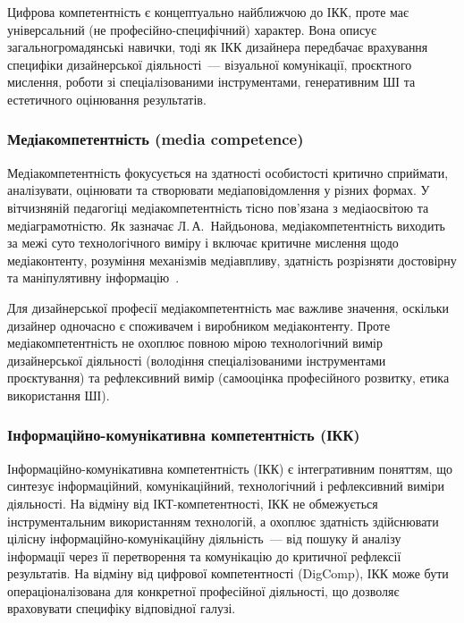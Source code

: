 Цифрова компетентність є концептуально найближчою до ІКК, проте має універсальний (не професійно-специфічний) характер. Вона описує загальногромадянські навички, тоді як ІКК дизайнера передбачає врахування специфіки дизайнерської діяльності~--- візуальної комунікації, проєктного мислення, роботи зі спеціалізованими інструментами, генеративним ШІ та естетичного оцінювання результатів.

\subsubsection{Медіакомпетентність (media competence)}\label{sssec:1.1.4}

Медіакомпетентність фокусується на здатності особистості критично сприймати, аналізувати, оцінювати та створювати медіаповідомлення у різних формах. У вітчизняній педагогіці медіакомпетентність тісно пов'язана з медіаосвітою та медіаграмотністю. Як зазначає Л.\,А.~Найдьонова, медіакомпетентність виходить за межі суто технологічного виміру і включає критичне мислення щодо медіаконтенту, розуміння механізмів медіавпливу, здатність розрізняти достовірну та маніпулятивну інформацію~\cite{Naidonova2013Media}.

Для дизайнерської професії медіакомпетентність має важливе значення, оскільки дизайнер одночасно є споживачем і виробником медіаконтенту. Проте медіакомпетентність не охоплює повною мірою технологічний вимір дизайнерської діяльності (володіння спеціалізованими інструментами проєктування) та рефлексивний вимір (самооцінка професійного розвитку, етика використання ШІ).

\subsubsection{Інформаційно-комунікативна компетентність (ІКК)}\label{sssec:1.1.5}

Інформаційно-комунікативна компетентність (ІКК) є інтегративним поняттям, що синтезує інформаційний, комунікаційний, технологічний і рефлексивний виміри діяльності. На відміну від ІКТ-компетентності, ІКК не обмежується інструментальним використанням технологій, а охоплює здатність здійснювати цілісну інформаційно-комунікаційну діяльність~--- від пошуку й аналізу інформації через її перетворення та комунікацію до критичної рефлексії результатів. На відміну від цифрової компетентності (DigComp), ІКК може бути операціоналізована для конкретної професійної діяльності, що дозволяє враховувати специфіку відповідної галузі.

